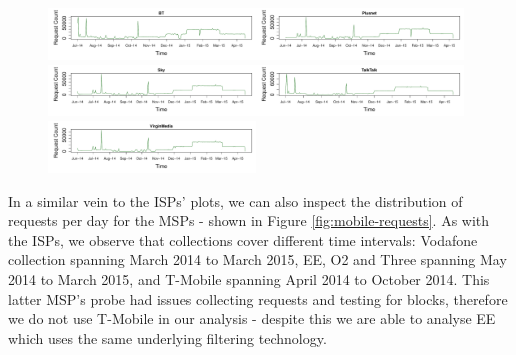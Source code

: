 \documentclass{bmcart}
\begin{document}
\begin{figure}[h!]
\caption{}
\includegraphics[width=0.49\textwidth]{imgs/BT-ts-requests.pdf}\includegraphics[width=0.49\textwidth]{imgs/Plusnet-ts-requests.pdf}
\includegraphics[width=0.49\textwidth]{imgs/Sky-ts-requests.pdf}\includegraphics[width=0.49\textwidth]{imgs/TalkTalk-ts-requests.pdf}
\includegraphics[width=0.49\textwidth]{imgs/VirginMedia-ts-requests.pdf}
\label{fig:broadband-requests}
\end{figure}

In a similar vein to the ISPs' plots, we can also inspect the distribution of requests per day for the MSPs - shown in Figure \ref{fig:mobile-requests}.
As with the ISPs, we observe that collections cover different time intervals: Vodafone collection spanning March 2014 to March 2015, EE, O2 and Three spanning May 2014 to March 2015, and T-Mobile spanning April 2014 to October 2014.
This latter MSP's probe had issues collecting requests and testing for blocks, therefore we do not use T-Mobile in our analysis - despite this we are able to analyse EE which uses the same underlying filtering technology.
\end{document}
